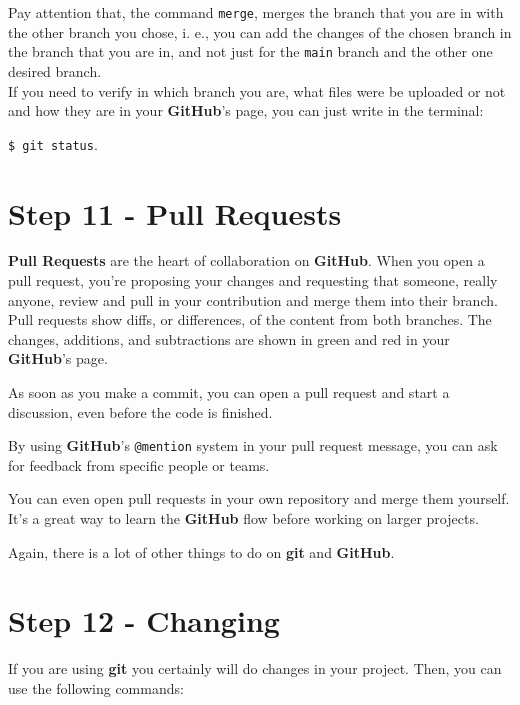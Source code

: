 \documentclass[12pt,a4paper,titlepage,brazil]{article}
\begin{document}
{Pay attention that, the command \texttt{merge}, merges the branch that you are in with the other branch you chose, i. e., you can add the changes of the chosen branch in the branch that you are in, and not just for the \texttt{main} branch and the other one desired branch.\\

If you need to verify in which branch you are, what files were be uploaded or not and how they are in your {\bf GitHub}'s page, you can just write in the terminal:

\texttt{\$ git status}.


\section{Step 11 - Pull Requests}

{\bf Pull Requests} are the heart of collaboration on {\bf GitHub}. When you open a pull request, you’re proposing your changes and requesting that someone, really anyone, review and pull in your contribution and merge them into their branch. Pull requests show diffs, or differences, of the content from both branches. The changes, additions, and subtractions are shown in {\color{green}green} and {\color{red}red} in your {\bf GitHub}'s page.

As soon as you make a commit, you can open a pull request and start a discussion, even before the code is finished.

By using {\bf GitHub}’s \texttt{@mention} system in your pull request message, you can ask for feedback from specific people or teams.

You can even open pull requests in your own repository and merge them yourself. It’s a great way to learn the {\bf GitHub} flow before working on larger projects.

Again, there is a lot of other things to do on {\bf git} and {\bf GitHub}.


\section{Step 12 - Changing}

If you are using {\bf git} you certainly will do changes in your project. Then, you can use the following commands:

}
\end{document}
